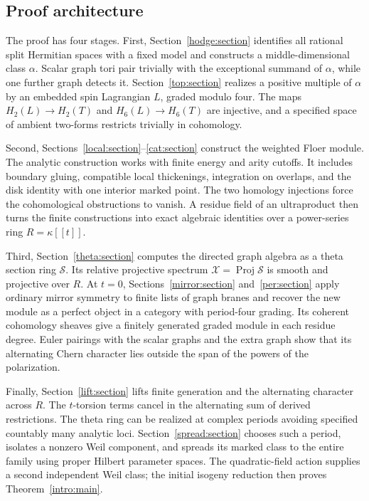 \documentclass[11pt]{article}
\theoremstyle{definition}
\theoremstyle{remark}
\numberwithin{equation}{section}
\begin{document}
\subsection{Proof architecture}

The proof has four stages.  First, Section~\ref{hodge:section} identifies
all rational split Hermitian spaces with a fixed model and constructs
a middle-dimensional class $\alpha$.  Scalar graph tori pair trivially with
the exceptional summand of $\alpha$, while one further graph detects it.
Section~\ref{top:section} realizes a positive multiple
of $\alpha$ by an embedded spin Lagrangian $L$, graded modulo four.  The
maps $H_2(L)\to H_2(T)$ and $H_6(L)\to H_6(T)$ are injective, and a
specified space of ambient two-forms restricts trivially in cohomology.

Second, Sections~\ref{local:section}--\ref{cat:section} construct the
weighted Floer module.  The analytic construction works with finite
energy and arity cutoffs.  It includes boundary gluing, compatible local
thickenings, integration on overlaps, and the disk identity with one
interior marked point.  The two homology injections force the
cohomological obstructions to vanish.  A residue field of an ultraproduct
then turns the finite constructions into exact algebraic identities over
a power-series ring $R=\kappa[[t]]$.

Third, Section~\ref{theta:section} computes the directed graph algebra
as a theta section ring $\mathscr S$.  Its relative projective spectrum
$\mathscr X=\operatorname{Proj}\mathscr S$ is smooth and projective over $R$.
At $t=0$, Sections~\ref{mirror:section} and~\ref{per:section} apply
ordinary mirror symmetry to finite lists of graph branes and recover
the new module as a perfect object in a category with period-four
grading.  Its coherent cohomology sheaves give a finitely generated
graded module in each residue degree.  Euler pairings with the scalar
graphs and the extra graph show that its alternating Chern character
lies outside the span of the powers of the polarization.

Finally, Section~\ref{lift:section} lifts finite generation and the
alternating character across $R$.  The $t$-torsion terms cancel in the
alternating sum of derived restrictions.  The theta ring can be realized
at complex periods avoiding specified countably many analytic loci.
Section~\ref{spread:section} chooses such a period, isolates a nonzero
Weil component, and spreads its marked class to the entire family using
proper Hilbert parameter spaces.  The quadratic-field action supplies
a second independent Weil class; the initial isogeny reduction then
proves Theorem~\ref{intro:main}.
\end{document}
